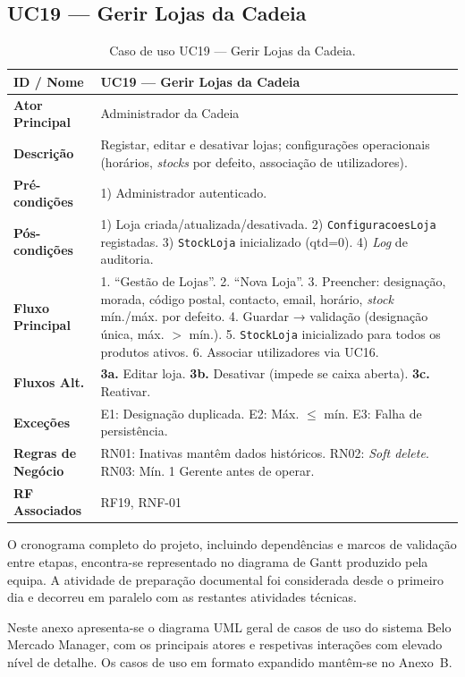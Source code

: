 \documentclass[a4paper,12pt]{scrreprt}
\begin{document}
\subsection*{UC19 --- Gerir Lojas da Cadeia}
\begin{table}[H]
\centering\small
\begin{tabular}{|p{3cm}|p{11cm}|}
\hline
\textbf{ID / Nome} & UC19 --- Gerir Lojas da Cadeia \\
\hline
\textbf{Ator Principal} & Administrador da Cadeia \\
\hline
\textbf{Descrição} & Registar, editar e desativar lojas; configurações operacionais (horários, \textit{stocks} por defeito, associação de utilizadores). \\
\hline
\textbf{Pré-condições} & 1) Administrador autenticado. \\
\hline
\textbf{Pós-condições} & 1) Loja criada/atualizada/desativada. 2) \texttt{ConfiguracoesLoja} registadas. 3) \texttt{StockLoja} inicializado (qtd=0). 4) \textit{Log} de auditoria. \\
\hline
\textbf{Fluxo Principal} & 1. ``Gestão de Lojas''. 2. ``Nova Loja''. 3. Preencher: designação, morada, código postal, contacto, email, horário, \textit{stock} mín./máx. por defeito. 4. Guardar → validação (designação única, máx. $>$ mín.). 5. \texttt{StockLoja} inicializado para todos os produtos ativos. 6. Associar utilizadores via UC16. \\
\hline
\textbf{Fluxos Alt.} & \textbf{3a.} Editar loja. \textbf{3b.} Desativar (impede se caixa aberta). \textbf{3c.} Reativar. \\
\hline
\textbf{Exceções} & E1: Designação duplicada. E2: Máx. $\leq$ mín. E3: Falha de persistência. \\
\hline
\textbf{Regras de Negócio} & RN01: Inativas mantêm dados históricos. RN02: \textit{Soft delete}. RN03: Mín. 1 Gerente antes de operar. \\
\hline
\textbf{RF Associados} & RF19, RNF-01 \\
\hline
\end{tabular}
\caption{Caso de uso UC19 --- Gerir Lojas da Cadeia.}
\end{table}


O cronograma completo do projeto, incluindo dependências e marcos de validação entre etapas, encontra-se representado no diagrama de Gantt produzido pela equipa. A atividade de preparação documental foi considerada desde o primeiro dia e decorreu em paralelo com as restantes atividades técnicas.


Neste anexo apresenta-se o diagrama UML geral de casos de uso do sistema Belo Mercado Manager, com os principais atores e respetivas interações com elevado nível de detalhe. Os casos de uso em formato expandido mantêm-se no Anexo~B.

\end{document}
